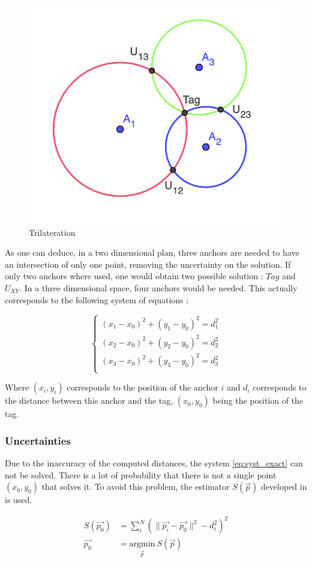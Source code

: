 \begin{figure}[H]
\centering
\includegraphics[width=.5\linewidth]{Images/trilateration.png}
\caption{Trilateration \label{fig:trilateration}}
\end{figure}

As one can deduce, in a two dimensional  plan, three anchors are needed to have an intersection of only one point, removing the uncertainty on the solution. If only two anchors where used, one would obtain two possible solution : $Tag$ and $U_{XY}$. In a three dimensional space, four anchors would be needed. This actually corresponds to 
the following system of equations :

\begin{equation}
\label{eq:syst_exact}
\begin{cases}
(x_1 - x_0)^2 + (y_1 - y_0)^2 = d_1^2 \\
(x_2 - x_0)^2 + (y_2 - y_0)^2 = d_2^2 \\
(x_3 - x_0)^2 + (y_3 - y_0)^2 = d_3^2 \\
\end{cases}
\end{equation}

Where $(x_i, y_i)$ corresponds to the position of the anchor $i$ and $d_i$ corresponds to the distance between this anchor and the tag, $(x_0, y_0)$ being the position of the tag.

\subsubsection{Uncertainties}

Due to the inaccuracy of the computed distances, the system \ref{eq:syst_exact} can not be solved. There is a lot of probability that there is not a single point $(x_0, y_0)$ that solves it. To avoid this problem, the estimator $S(\vec{p})$ developed in \cite{zhou2009efficient} is used.

\begin{equation}
\label{eq:syst_approx}
\begin{aligned}
S(\vec{p_0}) &= \sum_i^N (\|\vec{p_i} - \vec{p_0}\| ^2 - d_i^2 )^2 \\
\vec{p_0} &= \underset{\vec{p}}{\text{argmin}}~ S(\vec{p})
\end{aligned}
\end{equation}

